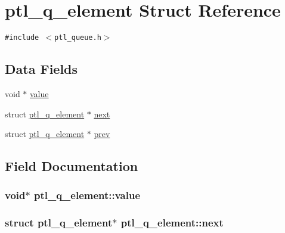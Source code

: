 \hypertarget{structptl__q__element}{
\section{ptl\_\-q\_\-element Struct Reference}
\label{structptl__q__element}
}
{\tt \#include $<$ptl\_\-queue.h$>$}

\subsection*{Data Fields}
\begin{CompactItemize}
\item 
void $\ast$ \hyperlink{structptl__q__element_bec4df4644327cc44d69867339fa9e90}{value}
\item 
struct \hyperlink{structptl__q__element}{ptl\_\-q\_\-element} $\ast$ \hyperlink{structptl__q__element_bb706267f152ba7e56146faf85f0853a}{next}
\item 
struct \hyperlink{structptl__q__element}{ptl\_\-q\_\-element} $\ast$ \hyperlink{structptl__q__element_3df32d19d7ad8316fd89b1d2f4af0ab1}{prev}
\end{CompactItemize}


\subsection{Field Documentation}
\hypertarget{structptl__q__element_bec4df4644327cc44d69867339fa9e90}{
\subsubsection{\setlength{\rightskip}{0pt plus 5cm}void$\ast$ {\bf ptl\_\-q\_\-element::value}}}
\label{structptl__q__element_bec4df4644327cc44d69867339fa9e90}


\hypertarget{structptl__q__element_bb706267f152ba7e56146faf85f0853a}{
\subsubsection{\setlength{\rightskip}{0pt plus 5cm}struct {\bf ptl\_\-q\_\-element}$\ast$ {\bf ptl\_\-q\_\-element::next}}}
\label{structptl__q__element_bb706267f152ba7e56146faf85f0853a}


